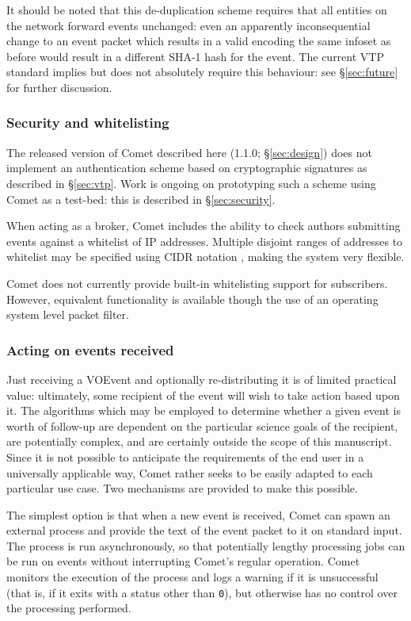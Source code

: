 \documentclass[5p,authoryear]{elsarticle}
\begin{document}
It should be noted that this de-duplication scheme requires that all entities
on the network forward events unchanged: even an apparently inconsequential
change to an event packet which results in a valid encoding the same infoset
as before would result in a different SHA-1 hash for the event. The current
VTP standard implies but does not absolutely require this behaviour: see
\S\ref{sec:future} for further discussion.

\subsubsection{Security and whitelisting}
\label{sec:design:security}

The released version of Comet described here (1.1.0; \S\ref{sec:design}) does
not implement an authentication scheme based on cryptographic signatures as
described in \S\ref{sec:vtp}. Work is ongoing on prototyping such a scheme
using Comet as a test-bed: this is described in \S\ref{sec:security}.

When acting as a broker, Comet includes the ability to check authors
submitting events against a whitelist of IP addresses. Multiple disjoint
ranges of addresses to whitelist may be specified using CIDR notation
\citep{Fuller:1993}, making the system very flexible.

Comet does not currently provide built-in whitelisting support for
subscribers. However, equivalent functionality is available though the use of
an operating system level packet filter.

\subsubsection{Acting on events received}
\label{sec:design:plugin}

Just receiving a VOEvent and optionally re-distributing it is of limited
practical value: ultimately, some recipient of the event will wish to take
action based upon it. The algorithms which may be employed to determine
whether a given event is worth of follow-up are dependent on the particular
science goals of the recipient, are potentially complex, and are certainly
outside the scope of this manuscript. Since it is not possible to anticipate
the requirements of the end user in a universally applicable way, Comet rather
seeks to be easily adapted to each particular use case. Two mechanisms are
provided to make this possible.

The simplest option is that when a new event is received, Comet can spawn an
external process and provide the text of the event packet to it on standard
input.  The process is run asynchronously, so that potentially lengthy
processing jobs can be run on events without interrupting Comet's regular
operation.  Comet monitors the execution of the process and logs a warning if
it is unsuccessful (that is, if it exits with a status other than \texttt{0}),
but otherwise has no control over the processing performed.
\end{document}
